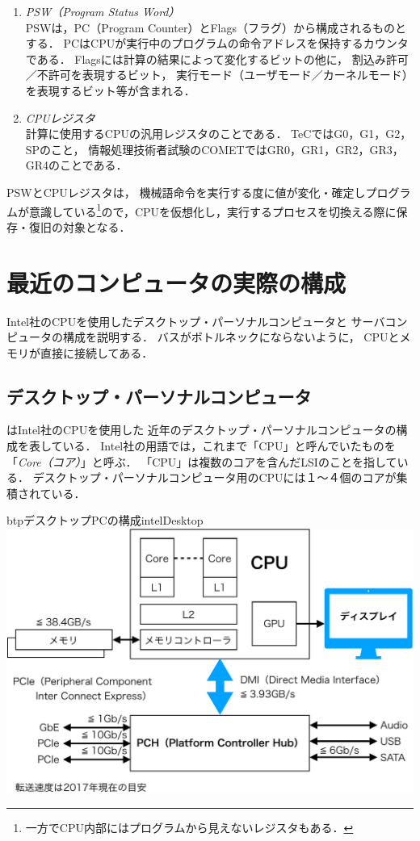 \begin{enumerate}
\item \emph{PSW（Program Status Word）} \\
  PSWは，PC（Program Counter）とFlags（フラグ）から構成されるものとする．
  PCはCPUが実行中のプログラムの命令アドレスを保持するカウンタである．
  Flagsには計算の結果によって変化するビットの他に，
  割込み許可／不許可を表現するビット，
  実行モード（ユーザモード／カーネルモード）を表現するビット等が含まれる．
\item \emph{CPUレジスタ} \\
  計算に使用するCPUの汎用レジスタのことである．
  TeCではG0，G1，G2，SPのこと，
  情報処理技術者試験のCOMETではGR0，GR1，GR2，GR3，GR4のことである．
\end{enumerate}

PSWとCPUレジスタは，
機械語命令を実行する度に値が変化・確定しプログラムが意識している\footnote{
  一方でCPU内部にはプログラムから見えないレジスタもある．
}ので，CPUを仮想化し，実行するプロセスを切換える際に保存・復旧の対象となる．

\section{最近のコンピュータの実際の構成}
Intel社のCPUを使用したデスクトップ・パーソナルコンピュータと
サーバコンピュータの構成を説明する．
バスがボトルネックにならないように，
CPUとメモリが直接に接続してある．

\subsection{デスクトップ・パーソナルコンピュータ}
はIntel社のCPUを使用した
近年のデスクトップ・パーソナルコンピュータの構成を表している．
Intel社の用語では，これまで「CPU」と呼んでいたものを
「\emph{Core（コア）}」と呼ぶ．
「CPU」は複数のコアを含んだLSIのことを指している．
デスクトップ・パーソナルコンピュータ用のCPUには１〜４個のコアが集積されている．

\begin{myfig}{btp}{デスクトップPCの構成}{intelDesktop}
  \includegraphics[scale=0.66]{Fig/intelDesktop-crop.pdf}
\end{myfig}

